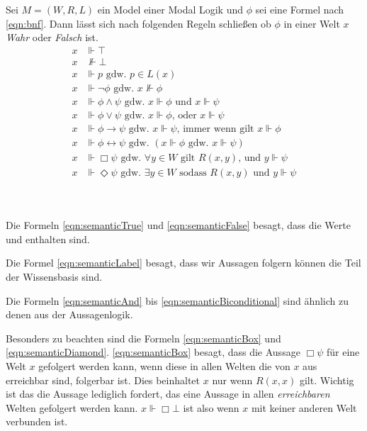 \begin{definition}
	\label{def:reasoning}
	\label{eq:possibleWorlds}
	Sei $M = (W,R,L)$ ein Model einer Modal Logik und $\phi$ sei eine Formel nach \eqref{eqn:bnf}.
	Dann lässt sich nach folgenden Regeln schließen ob $\phi$ in einer Welt $x$ \emph{Wahr} oder \emph{Falsch} ist.
	\begin{align}
		x &\Vdash \top\label{eqn:semanticTrue}\\
		x &\nVdash \bot\label{eqn:semanticFalse}\\
		x &\Vdash p\text{ gdw. }p \in L(x)\label{eqn:semanticLabel}\\
		x &\Vdash \neg \phi\text{ gdw. }x \nVdash \phi\\
		x &\Vdash \phi \wedge \psi\text{ gdw. }x \Vdash \phi\text{ und } x \Vdash \psi\label{eqn:semanticAnd}\\
		x &\Vdash \phi \vee \psi\text{ gdw. }x \Vdash \phi \text{, oder } x \Vdash \psi\\
		x &\Vdash \phi \rightarrow \psi\text{ gdw. }x \Vdash \psi\text{, immer wenn gilt }x \Vdash \phi\\
		x &\Vdash \phi \leftrightarrow \psi\text{ gdw. }( x \Vdash \phi\text{ gdw. }x \Vdash \psi)\label{eqn:semanticBiconditional}\\
		x &\Vdash \Box \psi \text{ gdw. }\forall y \in W \text{ gilt } R(x,y)\text{, und } y \Vdash \psi\label{eqn:semanticBox}\\
		x &\Vdash \Diamond \psi\text{ gdw. }\exists y \in W \text{ sodass }R(x,y)\text{ und }y \Vdash \psi\label{eqn:semanticDiamond}
	\end{align}	
\end{definition}
\cite[S.310]{huth2004logic}\\
\\
%
%
Die Formeln \eqref{eqn:semanticTrue} und \eqref{eqn:semanticFalse} besagt, dass die Werte \true und \false enthalten sind. 

Die Formel \eqref{eqn:semanticLabel} besagt, dass wir Aussagen folgern können die Teil der Wissensbasis sind.

Die Formeln \eqref{eqn:semanticAnd} bis \eqref{eqn:semanticBiconditional} sind ähnlich zu denen aus der Aussagenlogik.

Besonders zu beachten sind die Formeln \eqref{eqn:semanticBox} und \eqref{eqn:semanticDiamond}. 
\eqref{eqn:semanticBox} besagt, dass die Aussage $\Box\psi$ für eine Welt $x$ gefolgert werden kann, wenn diese in allen Welten die von $x$ aus erreichbar sind, folgerbar ist. 
Dies beinhaltet $x$ nur wenn $R(x,x)$ gilt.
Wichtig ist das die Aussage lediglich fordert, das eine Aussage in allen \emph{erreichbaren} Welten gefolgert werden kann. $x \Vdash \Box \bot$ ist also \true wenn $x$ mit keiner anderen Welt verbunden ist.

